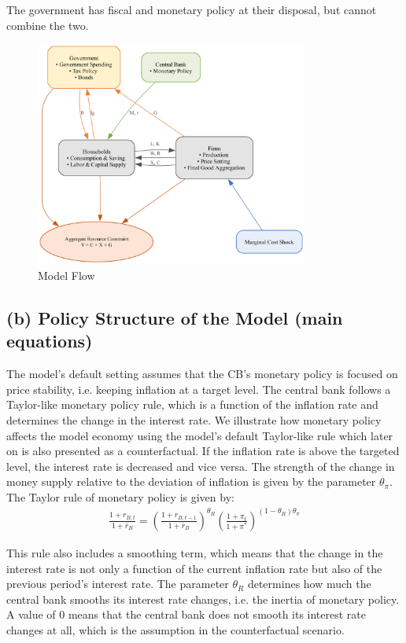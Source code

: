 \documentclass[12pt]{article}
\begin{document}
The government has fiscal and monetary policy at their disposal, but cannot combine the two. 


\begin{figure}[!h]
    \caption{Model Flow}\label{fig:model_flow}
    \centering
    \includegraphics[width=0.8\textwidth]{../../model_graph.png}
\end{figure}

\subsection*{(b) Policy Structure of the Model (main equations)}
The model's default setting assumes that the CB's monetary policy is focused on price stability, i.e. keeping inflation at a target level. The central bank
follows a Taylor-like monetary policy rule, which is a function of the inflation rate and determines the change in the interest rate. We illustrate how monetary policy affects the model economy using the model's default Taylor-like rule which later on is also presented as a counterfactual. If the inflation rate is above the targeted level, the interest rate is decreased and vice versa. The strength of the change in money supply relative to the deviation of inflation is given by the parameter $\theta_{\pi}$. 
The Taylor rule of monetary policy is given by:
\begin{align}
    \frac{1 + r_{B,t}}{1 + \bar{r}_B} = \left( \frac{1 + r_{B,t-1}}{1 + \bar{r}_B} \right)^{\theta_R} \left( \frac{1 + \pi_t}{1 + \pi^*} \right)^{(1 - \theta_R)\theta_{\pi}}
\end{align}

This rule also includes a smoothing term, which means that the change in the interest rate is not only a function of the current inflation rate but also of the previous period's interest rate. The parameter $\theta_R$ determines how much the central bank smooths its interest rate changes, i.e. the inertia of monetary policy. A value of 0 means that the central bank does not smooth its interest rate changes at all, which is the assumption in the counterfactual scenario. 
\end{document}
